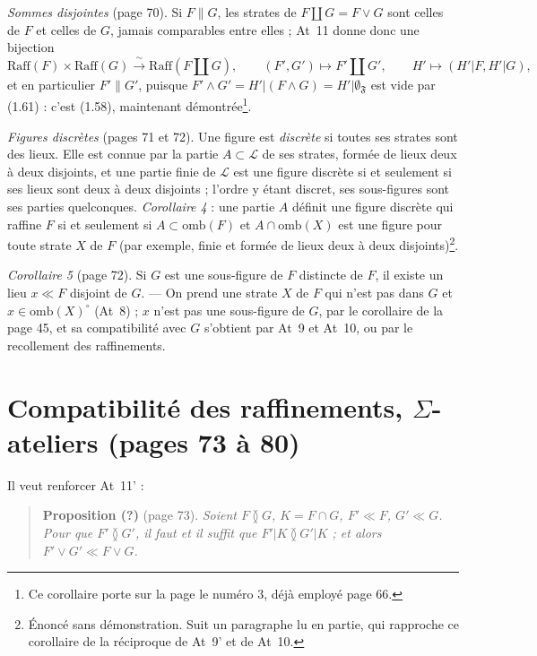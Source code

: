 \documentclass[11pt,a4paper]{article}
\begin{document}
\emph{Sommes disjointes} (page 70). Si $F \parallel G$, les strates de $F \amalg
G = F \vee G$ sont celles de $F$ et celles de $G$, jamais comparables entre
elles ; At~11 donne donc une bijection
\[
\mathrm{Raff}(F) \times \mathrm{Raff}(G) \xrightarrow{\ \sim\ } \mathrm{Raff}(F
\amalg G), \qquad (F', G') \longmapsto F' \amalg G', \qquad H' \longmapsto (H'|F,
H'|G) ,
\]
et en particulier $F' \parallel G'$, puisque $F' \wedge G' = H'|(F \wedge G) =
H'|\emptyset_{\mathfrak{F}}$ est vide par (1.61) : c'est (1.58), maintenant
démontrée\footnote{Ce corollaire porte sur la page le numéro 3, déjà employé page
66.}.

\emph{Figures discrètes} (pages 71 et 72). Une figure est \emph{discrète} si
toutes ses strates sont des lieux. Elle est connue par la partie $A \subset
\mathcal{L}$ de ses strates, formée de lieux deux à deux disjoints, et une
partie finie de $\mathcal{L}$ est une figure discrète si et seulement si ses
lieux sont deux à deux disjoints ; l'ordre y étant discret, ses sous-figures
sont ses parties quelconques. \emph{Corollaire 4} : une partie $A$ définit une
figure discrète qui raffine $F$ si et seulement si $A \subset \mathrm{omb}(F)$ et
$A \cap \mathrm{omb}(X)$ est une figure pour toute strate $X$ de $F$ (par
exemple, finie et formée de lieux deux à deux disjoints)\footnote{Énoncé sans
démonstration. Suit un paragraphe lu en partie, qui rapproche ce corollaire de la
réciproque de At~9' et de At~10.}.

\emph{Corollaire 5} (page 72). Si $G$ est une sous-figure de $F$ distincte de $F$,
il existe un lieu $x \ll F$ disjoint de $G$. --- On prend une strate $X$ de $F$
qui n'est pas dans $G$ et $x \in \mathrm{omb}(X)^{\circ}$ (At~8) ; $x$ n'est pas
une sous-figure de $G$, par le corollaire de la page 45, et sa compatibilité avec
$G$ s'obtient par At~9 et At~10, ou par le recollement des raffinements.

\section*{Compatibilité des raffinements, $\Sigma$-ateliers (pages 73 à 80)}

Il veut renforcer At~11' :

\begin{quote}
\textbf{Proposition (?)} (page 73). \emph{Soient $F \between G$, $K = F \cap G$,
$F' \ll F$, $G' \ll G$. Pour que $F' \between G'$, il faut et il suffit que
$F'|K \between G'|K$ ; et alors $F' \vee G' \ll F \vee G$.}
\end{quote}
\end{document}
